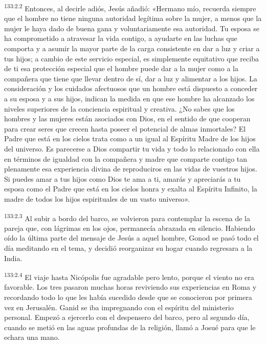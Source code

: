 \par 
\textsuperscript{133:2.2} Entonces, al decirle adiós, Jesús añadió: «Hermano mío, recuerda siempre que el hombre no tiene ninguna autoridad legítima sobre la mujer, a menos que la mujer le haya dado de buena gana y voluntariamente esa autoridad. Tu esposa se ha comprometido a atravesar la vida contigo, a ayudarte en las luchas que comporta y a asumir la mayor parte de la carga consistente en dar a luz y criar a tus hijos; a cambio de este servicio especial, es simplemente equitativo que reciba de ti esa protección especial que el hombre puede dar a la mujer como a la compañera que tiene que llevar dentro de sí, dar a luz y alimentar a los hijos. La consideración y los cuidados afectuosos que un hombre está dispuesto a conceder a su esposa y a sus hijos, indican la medida en que ese hombre ha alcanzado los niveles superiores de la conciencia espiritual y creativa. ¿No sabes que los hombres y las mujeres están asociados con Dios, en el sentido de que cooperan para crear seres que crecen hasta poseer el potencial de almas inmortales? El Padre que está en los cielos trata como a un igual al Espíritu Madre de los hijos del universo. Es parecerse a Dios compartir tu vida y todo lo relacionado con ella en términos de igualdad con la compañera y madre que comparte contigo tan plenamente esa experiencia divina de reproduciros en las vidas de vuestros hijos. Si puedes amar a tus hijos como Dios te ama a ti, amarás y apreciarás a tu esposa como el Padre que está en los cielos honra y exalta al Espíritu Infinito, la madre de todos los hijos espirituales de un vasto universo».

\par 
\textsuperscript{133:2.3} Al subir a bordo del barco, se volvieron para contemplar la escena de la pareja que, con lágrimas en los ojos, permanecía abrazada en silencio. Habiendo oído la última parte del mensaje de Jesús a aquel hombre, Gonod se pasó todo el día meditando en el tema, y decidió reorganizar su hogar cuando regresara a la India.

\par 
\textsuperscript{133:2.4} El viaje hasta Nicópolis fue agradable pero lento, porque el viento no era favorable. Los tres pasaron muchas horas reviviendo sus experiencias en Roma y recordando todo lo que les había sucedido desde que se conocieron por primera vez en Jerusalén. Ganid se iba impregnando con el espíritu del ministerio personal. Empezó a ejercerlo con el despensero del barco, pero al segundo día, cuando se metió en las aguas profundas de la religión, llamó a Josué para que le echara una mano.

